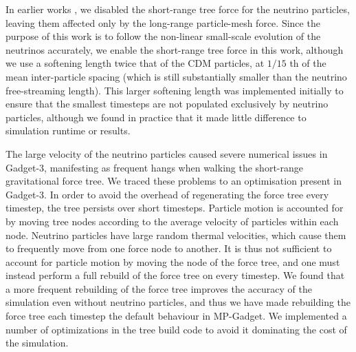 \documentclass[useAMS, usenatbib]{mnras}
\begin{document}
In earlier works \citep{Bird_2012}, we disabled the short-range tree force for the neutrino particles, leaving them affected only by the long-range particle-mesh force. Since the purpose of this work is to follow the non-linear small-scale evolution of the neutrinos accurately, we enable the short-range tree force in this work, although we use a softening length
twice that of the CDM particles, at $1/15$ th of the mean inter-particle spacing (which is still substantially smaller than the neutrino free-streaming length). This larger softening length was implemented initially to ensure that the smallest timesteps are not populated exclusively by neutrino particles, although we found in practice that it made little difference to simulation runtime or results.

The large velocity of the neutrino particles caused severe numerical issues in Gadget-3, manifesting as frequent hangs when walking the short-range gravitational force tree. We traced these problems to an optimisation present in Gadget-3. In order to avoid the overhead of regenerating the force tree every timestep, the tree persists over short timesteps. Particle motion is accounted for by moving tree nodes according to the average velocity of particles within each node. Neutrino particles have large random thermal velocities, which cause them to frequently move from one force node to another. It is thus not sufficient to account for particle motion by moving the node of the force tree, and one must instead perform a full rebuild of the force tree on every timestep. We found that a more frequent rebuilding of the force tree improves the accuracy of the simulation even without neutrino particles, and thus we have made rebuilding the force tree each timestep the default behaviour in MP-Gadget. We implemented a number of optimizations in the tree build code to avoid it dominating the cost of the simulation.
\end{document}
